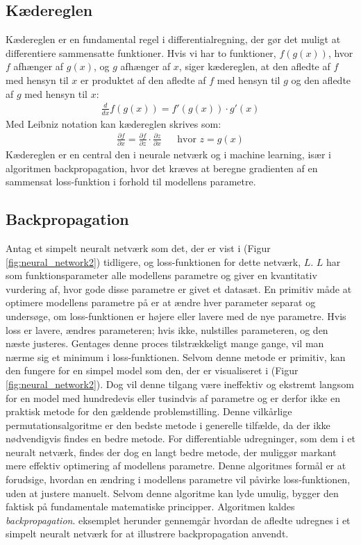 \documentclass{article}
\newcommand{\figureref}[1]{(Figur \ref{#1})}
\begin{document}
\subsection{Kædereglen}
Kædereglen er en fundamental regel i differentialregning, der gør det muligt at differentiere sammensatte funktioner. Hvis vi har to funktioner, $f(g(x))$, hvor $f$ afhænger af $g(x)$, og $g$ afhænger af $x$, siger kædereglen, at den afledte af $f$ med hensyn til $x$ er produktet af den afledte af $f$ med hensyn til $g$ og den afledte af $g$ med hensyn til $x$:
\begin{align}
  \frac{d}{dx} f(g(x)) = f'(g(x)) \cdot g'(x)
\end{align}
Med Leibniz notation kan kædereglen skrives som:
\begin{align}
  \frac{\partial f}{\partial x} = \frac{\partial f}{\partial z} \cdot \frac{\partial z}{\partial x}
  &&
  \text{hvor } z = g(x)
\end{align}
Kædereglen er en central den i neurale netværk og i machine learning, især i algoritmen backpropagation, hvor det kræves at beregne gradienten af en sammensat loss-funktion i forhold til modellens parametre. \parencite{Kirsanov_2024}
\subsection{Backpropagation}
Antag et simpelt neuralt netværk som det, der er vist i \figureref{fig:neural_network2} tidligere, og loss-funktionen for dette netværk, $L$. $L$ har som funktionsparameter alle modellens parametre og giver en kvantitativ vurdering af, hvor gode disse parametre er givet et datasæt. En primitiv måde at optimere modellens parametre på er at ændre hver parameter separat og undersøge, om loss-funktionen er højere eller lavere med de nye parametre. Hvis loss er lavere, ændres parameteren; hvis ikke, nulstilles parameteren, og den næste justeres. Gentages denne proces tilstrækkeligt mange gange, vil man nærme sig et minimum i loss-funktionen. Selvom denne metode er primitiv, kan den fungere for en simpel model som den, der er visualiseret i \figureref{fig:neural_network2}. Dog vil denne tilgang være ineffektiv og ekstremt langsom for en model med hundredevis eller tusindvis af parametre og er derfor ikke en praktisk metode for den gældende problemstilling. Denne vilkårlige permutationsalgoritme er den bedste metode i generelle tilfælde, da der ikke nødvendigvis findes en bedre metode. \parencite{Kirsanov_2024} For differentiable udregninger, som dem i et neuralt netværk, findes der dog en langt bedre metode, der muliggør markant mere effektiv optimering af modellens parametre. Denne algoritmes formål er at forudsige, hvordan en ændring i modellens parametre vil påvirke loss-funktionen, uden at justere manuelt. Selvom denne algoritme kan lyde umulig, bygger den faktisk på fundamentale matematiske principper. Algoritmen kaldes \textit{backpropagation}. \parencite{Kirsanov_2024, Nielsen_2019b, Sanderson_2017} eksemplet herunder gennemgår hvordan de afledte udregnes i et simpelt neuralt netværk for at illustrere backpropagation anvendt.
\end{document}
